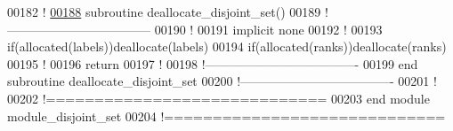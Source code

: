 \begin{DoxyCode}
00182   \textcolor{comment}{!}
\hypertarget{module__disjoint__set_8f90_source_l00188}{}\hyperlink{classmodule__disjoint__set_a717efa42d58a94fd3ba616cce27db828}{00188}   \textcolor{keyword}{subroutine }deallocate\_disjoint\_set()
00189   \textcolor{comment}{!-----------------------------------}
00190     \textcolor{comment}{!}
00191     \textcolor{keyword}{implicit none}
00192     \textcolor{comment}{!}
00193     \textcolor{keyword}{if}(\textcolor{keyword}{allocated}(labels))\textcolor{keyword}{deallocate}(labels)
00194     \textcolor{keyword}{if}(\textcolor{keyword}{allocated}(ranks))\textcolor{keyword}{deallocate}(ranks)
00195     \textcolor{comment}{!}
00196     return
00197     \textcolor{comment}{!}
00198   \textcolor{comment}{!-------------------------------------}
00199 \textcolor{keyword}{  end subroutine deallocate\_disjoint\_set}
00200   \textcolor{comment}{!-------------------------------------}
00201   \textcolor{comment}{!}
00202 \textcolor{comment}{!=============================}
00203 \textcolor{keyword}{end module module\_disjoint\_set}
00204 \textcolor{comment}{!=============================}
\end{DoxyCode}
